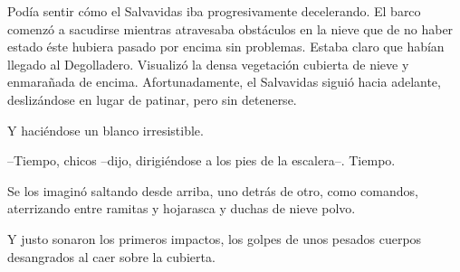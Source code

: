 Podía sentir cómo el Salvavidas iba progresivamente decelerando. El barco comenzó a sacudirse mientras atravesaba obstáculos en la nieve que de no haber estado éste hubiera pasado por encima sin problemas. Estaba claro que habían llegado al Degolladero. Visualizó la densa vegetación cubierta de nieve y enmarañada de encima. Afortunadamente, el Salvavidas siguió hacia adelante, deslizándose en lugar de patinar, pero sin detenerse.
 
Y haciéndose un blanco irresistible.
 
--Tiempo, chicos --dijo, dirigiéndose a los pies de la escalera--. Tiempo.
 
Se los imaginó saltando desde arriba, uno detrás de otro, como comandos, aterrizando entre ramitas y hojarasca y duchas de nieve polvo.
 
Y justo sonaron los primeros impactos, los golpes de unos pesados cuerpos desangrados al caer sobre la cubierta.
